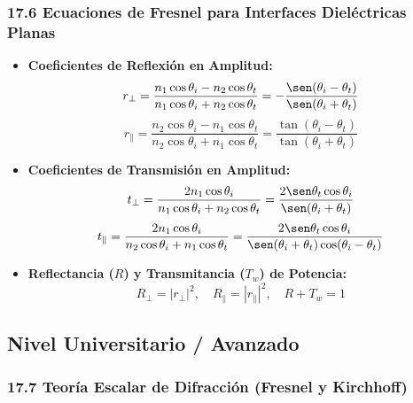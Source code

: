 \documentclass[11pt,a4paper]{article}
\begin{document}
\subsubsection*{17.6 Ecuaciones de Fresnel para Interfaces Dieléctricas Planas}

\begin{itemize}
  \item \textbf{Coeficientes de Reflexión en Amplitud:}
  \[
    r_\perp = \frac{n_1 \cos\theta_i - n_2 \cos\theta_t}{n_1 \cos\theta_i + n_2 \cos\theta_t} = -\frac{\sen(\theta_i - \theta_t)}{\sen(\theta_i + \theta_t)}
  \]
  \[
    r_\parallel = \frac{n_2 \cos\theta_i - n_1 \cos\theta_t}{n_2 \cos\theta_i + n_1 \cos\theta_t} = \frac{\tan(\theta_i - \theta_t)}{\tan(\theta_i + \theta_t)}
  \]
  \item \textbf{Coeficientes de Transmisión en Amplitud:}
  \[
    t_\perp = \frac{2 n_1 \cos\theta_i}{n_1 \cos\theta_i + n_2 \cos\theta_t} = \frac{2 \sen\theta_t \cos\theta_i}{\sen(\theta_i + \theta_t)}
  \]
  \[
    t_\parallel = \frac{2 n_1 \cos\theta_i}{n_2 \cos\theta_i + n_1 \cos\theta_t} = \frac{2 \sen\theta_t \cos\theta_i}{\sen(\theta_i + \theta_t)\cos(\theta_i - \theta_t)}
  \]
  \item \textbf{Reflectancia ($R$) y Transmitancia ($T_w$) de Potencia:}
  \[
    R_\perp = |r_\perp|^2, \quad R_\parallel = |r_\parallel|^2, \quad R + T_w = 1
  \]
\end{itemize}

\subsection*{Nivel Universitario / Avanzado}

\subsubsection*{17.7 Teoría Escalar de Difracción (Fresnel y Kirchhoff)}
\end{document}
